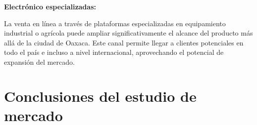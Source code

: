 \textbf{Electrónico especializadas:}

La venta en línea a través de plataformas especializadas en equipamiento industrial o agrícola puede ampliar significativamente el alcance del producto más allá de la ciudad de Oaxaca. Este canal permite llegar a clientes potenciales en todo el país e incluso a nivel internacional, aprovechando el potencial de expansión del mercado.

\section{Conclusiones del estudio de mercado}

